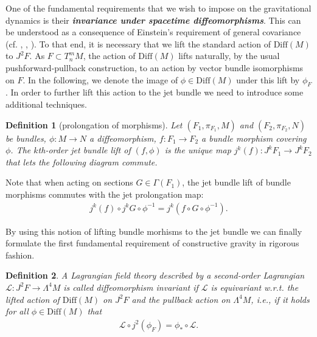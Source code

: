 \documentclass[%
 reprint,
nofootinbib,
 amsmath,amssymb,
 aps,
 prd,
floatfix,
]{revtex4-2}
\newtheorem{definition}{Definition}
\begin{document}
One of the fundamental requirements that we wish to impose on the gravitational dynamics is their \textit{\textbf{invariance under spacetime diffeomorphisms}}. 
This can be understood as a consequence of Einstein's requirement of general covariance (cf. \cite{Stachel1993-STATMO-5}, \cite{Pooley}, \cite{Norton1993-NORGCA}).
To that end, it is necessary that we lift the standard action of $\mathrm{Diff}(M)$ to $J^2F$.
As $F\subset T^m_nM$, the action of $\mathrm{Diff}(M)$ lifts naturally, by the usual pushforward-pullback construction, to an action by vector bundle isomorphisms on $F$.
In the following, we denote the image of $\phi \in \mathrm{Diff}(M)$ under this lift by $\phi_F$.
In order to further lift this action to the jet bundle we need to introduce some additional techniques.
\begin{definition}[prolongation of morphisms]
Let $(F_1,\pi_{F_1},M)$ and $(F_2,\pi_{F_2},N)$ be bundles, $\phi : M \rightarrow N$ a diffeomorphism, $f : F_1 \rightarrow F_2$ a bundle morphism covering $\phi$. The $k$th-order jet bundle lift of $(f,\phi)$ is the unique  map $j^k(f):J^kF_1 \rightarrow J^kF_2$ that lets the following diagram commute.
\begin{center}
\end{center}
\end{definition}
Note that when acting on sections $G \in \Gamma(F_1)$, the jet bundle lift of bundle morphisms commutes with the jet prolongation map:
\begin{align}
j^k(f) \circ j^kG \circ \phi^{-1} = j^k \left (
f \circ G \circ \phi^{-1} \right ).
\end{align}

By using this notion of lifting bundle morhisms to the jet bundle we can finally formulate the first fundamental requirement of constructive gravity in rigorous fashion. 
\begin{definition}
A Lagrangian field theory described by a second-order Lagrangian $\mathcal{L} : J^2F \rightarrow \Lambda^4 M$ is called diffeomorphism invariant if $\mathcal{L}$ is equivariant w.r.t. the lifted action of $\mathrm{Diff}(M)$ on $J^2F$ and the pullback action on $\Lambda^4M$, i.e., if it holds for all $\phi \in \mathrm{Diff}(M)$ that 
\begin{align}\label{DiffeoReq}\tag{Axiom 1}
     \mathcal{L}\circ j^2(\phi_F) = \phi_{\ast} \circ \mathcal{L}.
\end{align}
\end{definition}
\end{document}

